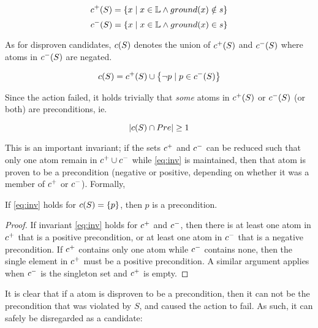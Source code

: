 \documentclass[\master/Master.tex]{subfiles}
\begin{document}
\begin{equation} \label{eq:cPlus}
    c^+(S) = \left\{ x \; | \; x \in \mathbb{L} \land ground(x) \notin s \right\}
\end{equation}
\begin{equation} \label{eq:cMinus}
    c^-(S) = \left\{ x \; | \; x \in \mathbb{L} \land ground(x) \in s \right\}
\end{equation}

As for disproven candidates, $c(S)$ denotes the union of $c^+(S)$ and $c^-(S)$ where atoms in $c^-(S)$ are negated.

\begin{equation}
    c(S) = c^+(S) \cup \left\{ \neg p \; | \; p \in c^-(S) \right\}
\end{equation}

Since the action failed, it holds trivially that \textit{some} atoms in $c^+(S)$ or $c^-(S)$ (or both) are preconditions, ie.

\begin{equation} \label{eq:inv}
    \left| c(S) \cap Pre \right| \geq 1
\end{equation}

This is an important invariant; if the sets $c^+$ and $c^-$ can be reduced such that only one atom remain in $c^+ \cup c^-$ while \eqref{eq:inv} is maintained, then that atom is proven to be a precondition (negative or positive, depending on whether it was a member of $c^+$ or $c^-$). Formally,

\begin{proposition} \label{prop:ncp:precond-holds}
    If \eqref{eq:inv} holds for $c(S) = \{p\}$, then $p$ is a precondition.
\end{proposition}

\begin{proof}
    If invariant \eqref{eq:inv} holds for $c^+$ and $c^-$, then there is at least one atom in $c^+$ that is a positive precondition, or at least one atom in $c^-$ that is a negative precondition. If $c^+$ contains only one atom while $c^-$ contains none, then the single element in $c^+$ must be a positive precondition. A similar argument applies when $c^-$ is the singleton set and $c^+$ is empty.
\end{proof}

It is clear that if a atom is disproven to be a precondition, then it can not be the precondition that was violated by $S$, and caused the action to fail. As such, it can safely be disregarded as a candidate:
\end{document}
